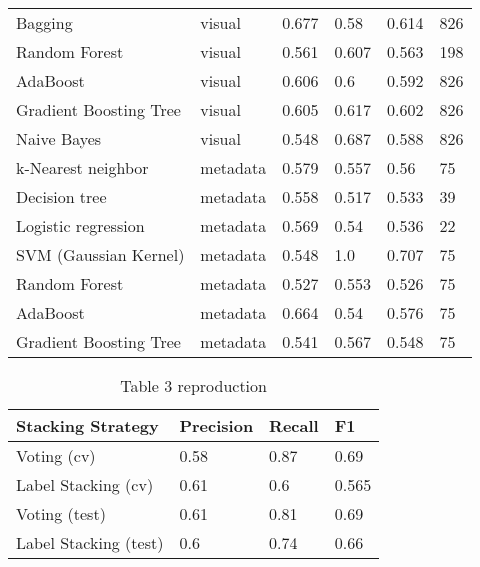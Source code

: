 \documentclass[sigconf]{acmart}
\begin{document}
\begin{table}[hbt!]
\begin{tabular}{llllll}
    Bagging                & visual   & 0.677     & 0.58   & 0.614 & 826          \\
    Random Forest          & visual   & 0.561     & 0.607  & 0.563 & 198          \\
    AdaBoost               & visual   & 0.606     & 0.6    & 0.592 & 826          \\
    Gradient Boosting Tree & visual   & 0.605     & 0.617  & 0.602 & 826          \\
    Naive Bayes            & visual   & 0.548     & 0.687  & 0.588 & 826          \\
    k-Nearest neighbor     & metadata & 0.579     & 0.557  & 0.56  & 75           \\
    Decision tree          & metadata & 0.558     & 0.517  & 0.533 & 39           \\
    Logistic regression    & metadata & 0.569     & 0.54   & 0.536 & 22           \\
    SVM (Gaussian Kernel)  & metadata & 0.548     & 1.0    & 0.707 & 75           \\
    Random Forest          & metadata & 0.527     & 0.553  & 0.526 & 75           \\
    AdaBoost               & metadata & 0.664     & 0.54   & 0.576 & 75           \\
    Gradient Boosting Tree & metadata & 0.541     & 0.567  & 0.548 & 75           \\ \hline
  \end{tabular}
\end{table}

\begin{table}[hbt!]
  \caption*{Table 3 reproduction}
  \begin{tabular}{llll}
    \hline
    Stacking Strategy     & Precision & Recall & F1    \\ \hline
    Voting (cv)           & 0.58      & 0.87   & 0.69  \\
    Label Stacking (cv)   & 0.61      & 0.6    & 0.565 \\
    Voting (test)         & 0.61      & 0.81   & 0.69  \\
    Label Stacking (test) & 0.6       & 0.74   & 0.66  \\ \hline
  \end{tabular}
\end{table}
\end{document}
